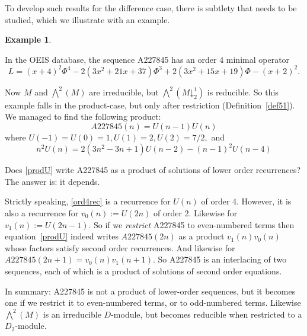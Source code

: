\documentclass[11pt,reqno]{amsart}
\theoremstyle{definition}
\newtheorem{example}[theorem]{Example}
\newcommand{\pda}{\mathord{\downarrow}}
\begin{document}
To develop such results for the difference case, there is subtlety that needs to be studied, which we illustrate with an example.


\begin{example} \label{A227845}

In the OEIS database, the sequence A227845 has an order $4$ minimal operator $$L=(x+4)^2\Phi^4-2(3x^2+21x+37)\Phi^3+2(3x^2+15x+19)\Phi-(x+2)^2.$$

Now $M$ and $\bigwedge^2(M)$ are irreducible, but $\bigwedge^2(M \pda^{1}_{2})$ is reducible.
So this example falls in the product-case, but only after restriction (Definition~\ref{def51}).
We managed to find the following product:
\begin{equation} \label{prodU}
    A227845(n) = U(n-1)U(n)
\end{equation}
where $U(-1) = U(0)=1, U(1)=2, U(2)=7/2,$ and 
\begin{equation}n^2U(n) = 2(3n^2-3n+1)U(n-2) - (n-1)^2U(n-4) \label{ord4rec} \end{equation}

Does \eqref{prodU} write A227845 as a product of solutions of lower order recurrences? The answer is: it depends.

Strictly speaking, \eqref{ord4rec} is a recurrence for $U(n)$ of order 4. However, it is also a recurrence for $v_0(n) := U(2n)$ of order 2. Likewise for $v_1(n) := U(2n-1)$.  So if we {\em restrict} A227845 to even-numbered terms then equation~\eqref{prodU} indeed writes $A227845(2n)$ as a product $v_1(n) v_0(n)$ whose factors satisfy second order recurrences. And likewise for $A227845(2n+1) = v_0(n)v_1(n+1)$.  So A227845 is an interlacing of two sequences, each of which is a product of solutions of second order equations.

In summary: A227845 is not a product of lower-order sequences, but it becomes one if we restrict it to even-numbered terms, or to odd-numbered terms.
Likewise $\bigwedge^2(M)$ is an irreducible $D$-module, but becomes reducible when restricted to a $D_2$-module.
\end{example}
\end{document}
